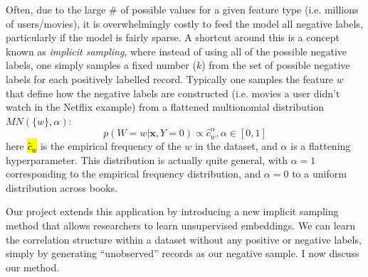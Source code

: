 \documentclass{article} %
\begin{document}
Often, due to the large \# of possible values for a given feature type (i.e. millions of users/movies), it is overwhelmingly costly to feed the model all negative labels, particularly if the model is fairly sparse. A shortcut around this is a concept known as \textit{implicit sampling}, where instead of using all of the possible negative labels, one simply samples a fixed number ($k$) from the set of possible negative labels for each positively labelled record. Typically one samples the feature $w$ that define how the negative labels are constructed (i.e. movies a user didn't watch in the Netflix example) from a flattened multionomial distribution $MN(\{w\},\alpha)$: 
\[p(W=w|\mathbf{x},Y=0)  \propto \hat c_w^\alpha,\alpha \in [0,1] \] 
here \hl{$\hat c_w$}  is the empirical frequency of the $w$ in the dataset, and $\alpha$ is a flattening hyperparameter. This distribution is actually quite general, with $\alpha=1$ corresponding to the empirical frequency distribution, and $\alpha=0$ to a uniform distribution across books.


Our project extends this application by introducing a new implicit sampling method that allows researchers to learn unsupervised embeddings. We can learn the correlation structure within a dataset without any positive or negative labels, simply by generating ``unobserved'' records as our negative sample. I now discuss our method.
\end{document}
